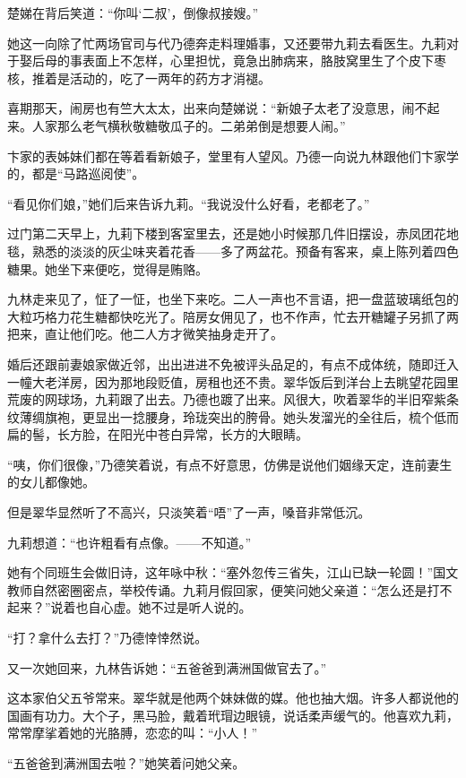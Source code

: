 \par 楚娣在背后笑道：“你叫‘二叔’，倒像叔接嫂。”
\par 她这一向除了忙两场官司与代乃德奔走料理婚事，又还要带九莉去看医生。九莉对于娶后母的事表面上不怎样，心里担忧，竟急出肺病来，胳肢窝里生了个皮下枣核，推着是活动的，吃了一两年的药方才消褪。
\par 喜期那天，闹房也有竺大太太，出来向楚娣说：“新娘子太老了没意思，闹不起来。人家那么老气横秋敬糖敬瓜子的。二弟弟倒是想要人闹。”
\par 卞家的表姊妹们都在等着看新娘子，堂里有人望风。乃德一向说九林跟他们卞家学的，都是“马路巡阅使”。
\par “看见你们娘，”她们后来告诉九莉。“我说没什么好看，老都老了。”
\par 过门第二天早上，九莉下楼到客室里去，还是她小时候那几件旧摆设，赤凤团花地毯，熟悉的淡淡的灰尘味夹着花香——多了两盆花。预备有客来，桌上陈列着四色糖果。她坐下来便吃，觉得是贿赂。
\par 九林走来见了，怔了一怔，也坐下来吃。二人一声也不言语，把一盘蓝玻璃纸包的大粒巧格力花生糖都快吃光了。陪房女佣见了，也不作声，忙去开糖罐子另抓了两把来，直让他们吃。他二人方才微笑抽身走开了。
\par 婚后还跟前妻娘家做近邻，出出进进不免被评头品足的，有点不成体统，随即迁入一幢大老洋房，因为那地段贬值，房租也还不贵。翠华饭后到洋台上去眺望花园里荒废的网球场，九莉跟了出去。乃德也踱了出来。风很大，吹着翠华的半旧窄紫条纹薄绸旗袍，更显出一捻腰身，玲珑突出的胯骨。她头发溜光的全往后，梳个低而扁的髻，长方脸，在阳光中苍白异常，长方的大眼睛。
\par “咦，你们很像，”乃德笑着说，有点不好意思，仿佛是说他们姻缘天定，连前妻生的女儿都像她。
\par 但是翠华显然听了不高兴，只淡笑着“唔”了一声，嗓音非常低沉。
\par 九莉想道：“也许粗看有点像。——不知道。”
\par 她有个同班生会做旧诗，这年咏中秋：“塞外忽传三省失，江山已缺一轮圆！”国文教师自然密圈密点，举校传诵。九莉月假回家，便笑问她父亲道：“怎么还是打不起来？”说着也自心虚。她不过是听人说的。
\par “打？拿什么去打？”乃德悻悻然说。
\par 又一次她回来，九林告诉她：“五爸爸到满洲国做官去了。”
\par 这本家伯父五爷常来。翠华就是他两个妹妹做的媒。他也抽大烟。许多人都说他的国画有功力。大个子，黑马脸，戴着玳瑁边眼镜，说话柔声缓气的。他喜欢九莉，常常摩挲着她的光胳膊，恋恋的叫：“小人！”
\par “五爸爸到满洲国去啦？”她笑着问她父亲。
